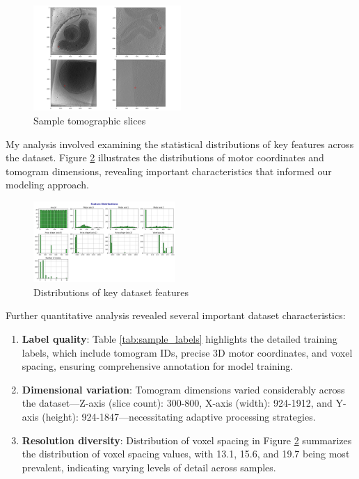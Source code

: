 \documentclass{article}
\begin{document}
\begin{figure}[htb]
    \centering
    \includegraphics[width=0.5\textwidth]{images/random_training_samples.png}
    \caption{Sample tomographic slices}
    \label{fig:sample_slices}
\end{figure}

My analysis involved examining the statistical distributions of key features across the dataset. Figure \ref{fig:feature_distributions} illustrates the distributions of motor coordinates and tomogram dimensions, revealing important characteristics that informed our modeling approach.

\begin{figure}[htb]
    \centering
    \includegraphics[width=0.48\textwidth]{images/feature_distributions.png}
    \caption{Distributions of key dataset features}
    \label{fig:feature_distributions}
\end{figure}


Further quantitative analysis revealed several important dataset characteristics:

\begin{enumerate}
    \item \textbf{Label quality}: Table \ref{tab:sample_labels} highlights the detailed training labels, which include tomogram IDs, precise 3D motor coordinates, and voxel spacing, ensuring comprehensive annotation for model training.
    \item \textbf{Dimensional variation}: Tomogram dimensions varied considerably across the dataset—Z-axis (slice count): 300-800, X-axis (width): 924-1912, and Y-axis (height): 924-1847—necessitating adaptive processing strategies.
    \item \textbf{Resolution diversity}: Distribution of voxel spacing in Figure \ref{fig:feature_distributions} summarizes the distribution of voxel spacing values, with 13.1, 15.6, and 19.7 being most prevalent, indicating varying levels of detail across samples.
\end{enumerate}
\end{document}
